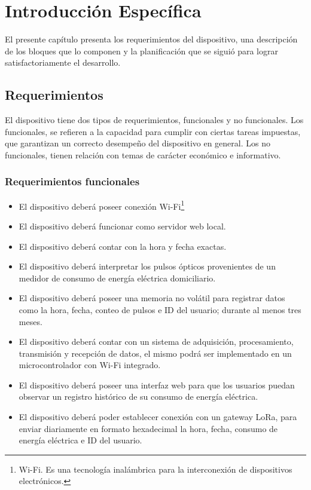 \chapter{Introducción Específica} %

\label{Chapter2}


El presente capítulo presenta los requerimientos del dispositivo, una descripción de los bloques que lo componen y la planificación que se siguió para lograr satisfactoriamente el desarrollo.


\section{Requerimientos}

El dispositivo tiene dos tipos de requerimientos, funcionales y no funcionales. Los funcionales, se refieren a la capacidad para cumplir con ciertas tareas impuestas, que garantizan un correcto desempeño del dispositivo en general. Los no funcionales, tienen relación con temas de carácter económico e informativo.

\subsection{Requerimientos funcionales}

\begin{itemize}
	\item El dispositivo deberá poseer conexión Wi-Fi\footnote{Wi-Fi. Es una tecnología inalámbrica para la interconexión de dispositivos electrónicos.}
	\item El dispositivo deberá funcionar como servidor web local.
	\item El dispositivo deberá contar con la hora y fecha exactas.
	\item El dispositivo deberá interpretar los pulsos ópticos provenientes de un medidor de consumo de energía eléctrica domiciliario.
	\item El dispositivo deberá poseer una memoria no volátil para registrar datos como la hora, fecha, conteo de pulsos e ID del usuario; durante al menos tres meses.
	\item El dispositivo deberá contar con un sistema de adquisición, procesamiento, transmisión y recepción de datos, el mismo podrá ser implementado en un microcontrolador con Wi-Fi integrado.
	\item El dispositivo deberá poseer una interfaz web para que los usuarios puedan observar un registro histórico de su consumo de energía eléctrica.
	\item El dispositivo deberá poder establecer conexión con un gateway LoRa, para enviar diariamente en formato hexadecimal la hora, fecha, consumo de energía eléctrica e ID del usuario.
\end{itemize}

